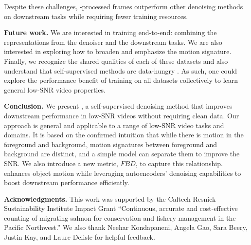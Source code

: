Despite these challenges, \NAME{}-processed frames outperform other denoising methods on downstream tasks while requiring fewer training resources.  

\noindent{}\textbf{Future work.} 
We are interested in training end-to-end: combining the representations from the denoiser and the downstream tasks. 
We are also interested in exploring how to broaden and emphasize the motion signature. 
Finally, we recognize the shared qualities of each of these datasets and also understand that self-supervised methods are data-hungry \cite{li2022supervision, singh2024zero}. As such, one could explore the performance benefit of training on all datasets collectively to learn general low-SNR video properties. 

\noindent{}\textbf{Conclusion.}
We present \NAME{}, a self-supervised denoising method that improves downstream performance in low-SNR videos without requiring clean data. Our approach is general and applicable to a range of low-SNR video tasks and domains. It is based on the confirmed intuition that while there is motion in the foreground and background, motion signatures between foreground and background are distinct, and a simple model can separate them to improve the SNR. We also introduce a new metric, $FBD$,  to capture this relationship. \NAME{} enhances object motion while leveraging autoencoders’ denoising capabilities to boost downstream performance efficiently.

\noindent{}\textbf{Acknowledgments.} 
This work was supported by the Caltech Resnick Sustainability Institute Impact Grant ``Continuous, accurate and cost-effective counting of migrating salmon for conservation and fishery management in the Pacific Northwest.'' We also thank Neehar Kondapaneni, Angela Gao, Sara Beery, Justin Kay, and Laure Delisle for helpful feedback.